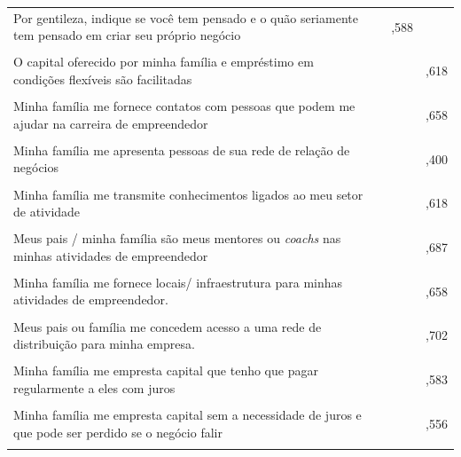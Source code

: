 \begin{center}
\begin{longtable}{p{6cm} c c c }
Por gentileza, indique se você tem pensado e o quão seriamente tem pensado em criar seu próprio negócio
 &  & ,588 & \\\\
 
O capital oferecido por minha família e empréstimo em condições flexíveis são facilitadas
 &  & & ,618 \\\\
 
Minha família me fornece contatos com pessoas que podem me ajudar na carreira de empreendedor
 &  & & ,658 \\\\
 
Minha família me apresenta pessoas de sua rede de relação de negócios
 &  & & ,400 \\\\
 
Minha família me transmite conhecimentos ligados ao meu setor de atividade
 &  & & ,618 \\\\
 
Meus pais / minha família são meus mentores ou \textit{coachs} nas minhas atividades de empreendedor
 &  & & ,687 \\\\
 
Minha família me fornece locais/ infraestrutura para minhas atividades de empreendedor.
 &  & & ,658 \\\\
 
Meus pais ou família me concedem acesso a uma rede de distribuição para minha empresa.
 &  & & ,702 \\\\
 
 
Minha família me empresta capital que  tenho que pagar regularmente a eles com juros		
 &  & & ,583 \\\\
 
Minha família me empresta capital sem a necessidade de juros e que pode ser perdido se o negócio falir
 & & & ,556 \\\\ \hline 
 
\end{longtable}
\end{center}



